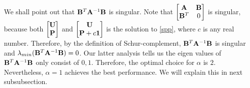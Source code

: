 \documentclass[english]{pkupaper}
\begin{document}
We shall point out that $\mathbf{B}^T\mathbf{A}^{-1}\mathbf{B}$ is singular. Note that $\begin{bmatrix}\mathbf{A}&\mathbf{B}\\\mathbf{B}^T&0\end{bmatrix}$ is singular, because both $\begin{bmatrix}\mathbf{U}\\\mathbf{P}\end{bmatrix}$ and $\begin{bmatrix}\mathbf{U}\\\mathbf{P}+c\mathbf{1}\end{bmatrix}$ is the solution to \ref{spp}, where $c$ is any real number. Therefore, by the definition of Schur-complement, $\mathbf{B}^T\mathbf{A}^{-1}\mathbf{B}$ is singular and $\lambda_{min}(\mathbf{B}^T\mathbf{A}^{-1}\mathbf{B})=0$. Our latter analysis tells us the eigen values of $\mathbf{B}^T\mathbf{A}^{-1}\mathbf{B}$ only consist of $0,1$. Therefore, the optimal choice for $\alpha$ is $2$. Nevertheless, $\alpha=1$ achieves the best performance. We will explain this in next subsubsection.
\end{document}
